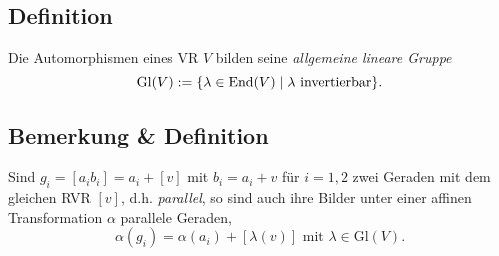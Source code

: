  \subsection{Definition}
 	\begin{Definition}
 		Die Automorphismen eines VR $ V $ bilden seine \emph{allgemeine lineare Gruppe}
 		\[
 			\mathrm{Gl}(V):= \{\lambda\in \operatorname{End}(V)\mid \lambda \text{ invertierbar}\}.
 		\]
 	\end{Definition}
 \subsection{Bemerkung \& Definition}
 	\begin{Definition}
 		Sind $ g_i = [a_ib_i]=a_i + [v] $ mit $ b_i = a_i + v $ für $ i = 1,2 $ zwei Geraden mit dem gleichen RVR $ [v] $, d.h. \emph{parallel}, so sind auch ihre Bilder unter einer affinen Transformation $ \alpha $ parallele Geraden,
 		\[
 			\alpha(g_i) = \alpha(a_i) + [\lambda(v)] \text{ mit } \lambda\in \mathrm{Gl}(V).
 		\]
 	\end{Definition}

